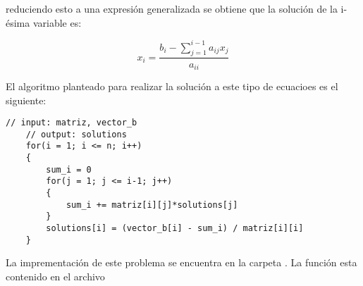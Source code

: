 reduciendo esto a una expresión generalizada se obtiene que la solución de la i-ésima variable es:

\begin{equation*}
    x_i = \frac{b_{i}-\sum\limits_{j=1}^{i-1} a_{ij}x_{j}}{a_{ii}}
\end{equation*}

El algoritmo planteado para realizar la solución a este tipo de ecuacioes es el siguiente:

\begin{lstlisting}[style=CStyle]
    // input: matriz, vector_b
    // output: solutions
    for(i = 1; i <= n; i++)
    {
        sum_i = 0
        for(j = 1; j <= i-1; j++)
        {
            sum_i += matriz[i][j]*solutions[j]
        }
        solutions[i] = (vector_b[i] - sum_i) / matriz[i][i]
    }

\end{lstlisting}

La imprementación de este problema se encuentra en la carpeta . La función  esta contenido en el archivo 
